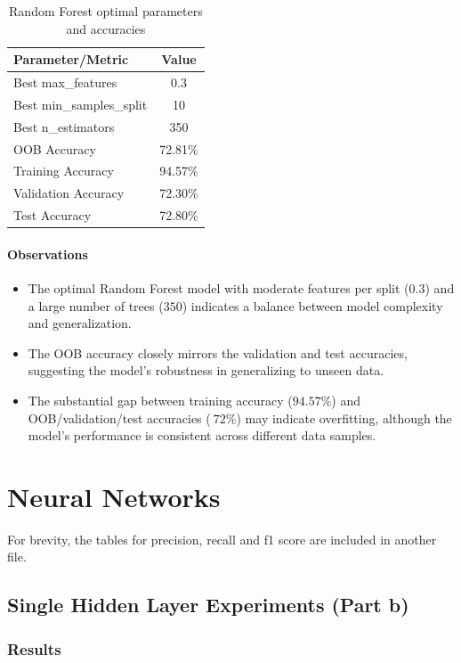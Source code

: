 \documentclass[12pt]{article}
\begin{document}
\begin{table}[h!]
\centering
\begin{tabular}{|l|c|}
\hline
\textbf{Parameter/Metric} & \textbf{Value} \\
\hline
Best max\_features & 0.3 \\
Best min\_samples\_split & 10 \\
Best n\_estimators & 350 \\
OOB Accuracy & 72.81\% \\
Training Accuracy & 94.57\% \\
Validation Accuracy & 72.30\% \\
Test Accuracy & 72.80\% \\
\hline
\end{tabular}
\caption{Random Forest optimal parameters and accuracies}
\label{tab:rf_results}
\end{table}

\paragraph{Observations}
\begin{itemize}
  \item The optimal Random Forest model with moderate features per split (\(0.3\)) and a large number of trees (\(350\)) indicates a balance between model complexity and generalization.
  \item The OOB accuracy closely mirrors the validation and test accuracies, suggesting the model's robustness in generalizing to unseen data.
  \item The substantial gap between training accuracy (\(94.57\%\)) and OOB/validation/test accuracies (\(~72\%\)) may indicate overfitting, although the model's performance is consistent across different data samples.
\end{itemize}


\section{Neural Networks}

For brevity, the tables for precision, recall and f1 score are included in another file.

\subsection{Single Hidden Layer Experiments (Part b)}

\subsubsection{Results}
\end{document}
